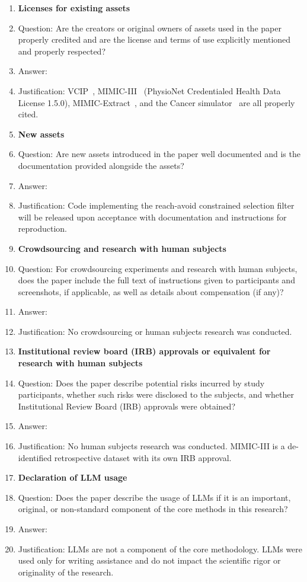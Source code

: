 \documentclass{article}
\begin{document}
\begin{enumerate}
\item {\bf Licenses for existing assets}
    \item[] Question: Are the creators or original owners of assets used in the paper properly credited and are the license and terms of use explicitly mentioned and properly respected?
    \item[] Answer: \answerYes{}
    \item[] Justification: VCIP~\citep{melnychuk2025vcip}, MIMIC-III~\citep{johnson2016mimic} (PhysioNet Credentialed Health Data License 1.5.0), MIMIC-Extract~\citep{wang2020mimic}, and the Cancer simulator~\citep{bica2020cancer} are all properly cited.

\item {\bf New assets}
    \item[] Question: Are new assets introduced in the paper well documented and is the documentation provided alongside the assets?
    \item[] Answer: \answerYes{}
    \item[] Justification: Code implementing the reach-avoid constrained selection filter will be released upon acceptance with documentation and instructions for reproduction.

\item {\bf Crowdsourcing and research with human subjects}
    \item[] Question: For crowdsourcing experiments and research with human subjects, does the paper include the full text of instructions given to participants and screenshots, if applicable, as well as details about compensation (if any)?
    \item[] Answer: \answerNA{}
    \item[] Justification: No crowdsourcing or human subjects research was conducted.

\item {\bf Institutional review board (IRB) approvals or equivalent for research with human subjects}
    \item[] Question: Does the paper describe potential risks incurred by study participants, whether such risks were disclosed to the subjects, and whether Institutional Review Board (IRB) approvals were obtained?
    \item[] Answer: \answerNA{}
    \item[] Justification: No human subjects research was conducted. MIMIC-III is a de-identified retrospective dataset with its own IRB approval.

\item {\bf Declaration of LLM usage}
    \item[] Question: Does the paper describe the usage of LLMs if it is an important, original, or non-standard component of the core methods in this research?
    \item[] Answer: \answerNA{}
    \item[] Justification: LLMs are not a component of the core methodology. LLMs were used only for writing assistance and do not impact the scientific rigor or originality of the research.

\end{enumerate}
\end{document}
